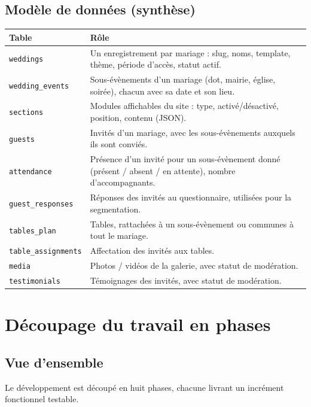 \documentclass[11pt,a4paper]{article}
\begin{document}
\subsection{Modèle de données (synthèse)}
\begin{longtable}{L{3.5cm}L{10.5cm}}
\toprule
\textbf{Table} & \textbf{Rôle} \\
\midrule
\endhead
\texttt{weddings} & Un enregistrement par mariage : slug, noms, template, thème,
période d'accès, statut actif. \\
\texttt{wedding\_events} & Sous-évènements d'un mariage (dot, mairie, église, soirée),
chacun avec sa date et son lieu. \\
\texttt{sections} & Modules affichables du site : type, activé/désactivé, position,
contenu (JSON). \\
\texttt{guests} & Invités d'un mariage, avec les sous-évènements auxquels ils sont
conviés. \\
\texttt{attendance} & Présence d'un invité pour un sous-évènement donné (présent /
absent / en attente), nombre d'accompagnants. \\
\texttt{guest\_responses} & Réponses des invités au questionnaire, utilisées pour
la segmentation. \\
\texttt{tables\_plan} & Tables, rattachées à un sous-évènement ou communes à tout
le mariage. \\
\texttt{table\_assignments} & Affectation des invités aux tables. \\
\texttt{media} & Photos / vidéos de la galerie, avec statut de modération. \\
\texttt{testimonials} & Témoignages des invités, avec statut de modération. \\
\bottomrule
\end{longtable}

\section{Découpage du travail en phases}

\subsection{Vue d'ensemble}
Le développement est découpé en huit phases, chacune livrant un incrément
fonctionnel testable.
\end{document}

